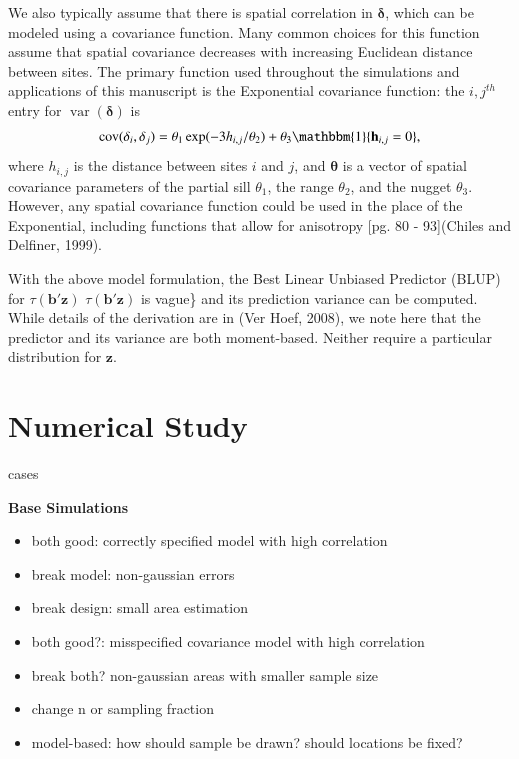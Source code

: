 \documentclass[]{elsarticle} %
\begin{document}
We also typically assume that there is spatial correlation in
\(\bm{\delta}\), which can be modeled using a covariance function. Many
common choices for this function assume that spatial covariance
decreases with increasing Euclidean distance between sites. The primary
function used throughout the simulations and applications of this
manuscript is the Exponential covariance function: the \(i,j^{th}\)
entry for \(\mathop{\mathrm{{var}}}(\bm{\delta})\) is \mbox{}
\begin{align}\label{equation:expcov}
\mathop{\mathrm{{cov}}}(\delta_i, \delta_j) = \theta_1\exp(-3h_{i,j}/\theta_2) + \theta_3\mathbbm{1}\{\mathbf{h}_{i,j} = 0\}, 
\end{align} where \(h_{i,j}\) is the distance between sites \(i\) and
\(j\), and \(\bm{\theta}\) is a vector of spatial covariance parameters
of the partial sill \(\theta_1\), the range \(\theta_2\), and the nugget
\(\theta_3\). However, any spatial covariance function could be used in
the place of the Exponential, including functions that allow for
anisotropy {[}pg. 80 - 93{]}(Chiles and Delfiner, 1999).

With the above model formulation, the Best Linear Unbiased Predictor
(BLUP) for \(\tau(\mathbf{b}'\mathbf{z})\)
\(\tau(\mathbf{b}'\mathbf{z})\) is vague\} and its prediction variance
can be computed. While details of the derivation are in (Ver Hoef,
2008), we note here that the predictor and its variance are both
moment-based. Neither require a particular distribution for
\(\mathbf{z}\).

\hypertarget{sec:numstudy}{%
\section{Numerical Study}\label{sec:numstudy}}

cases

\textbf{Base Simulations}

\begin{itemize}
\item
  both good: correctly specified model with high correlation
\item
  break model: non-gaussian errors
\item
  break design: small area estimation
\item
  both good?: misspecified covariance model with high correlation
\item
  break both? non-gaussian areas with smaller sample size
\item
  change n or sampling fraction
\item
  model-based: how should sample be drawn? should locations be fixed?
\end{itemize}
\end{document}
